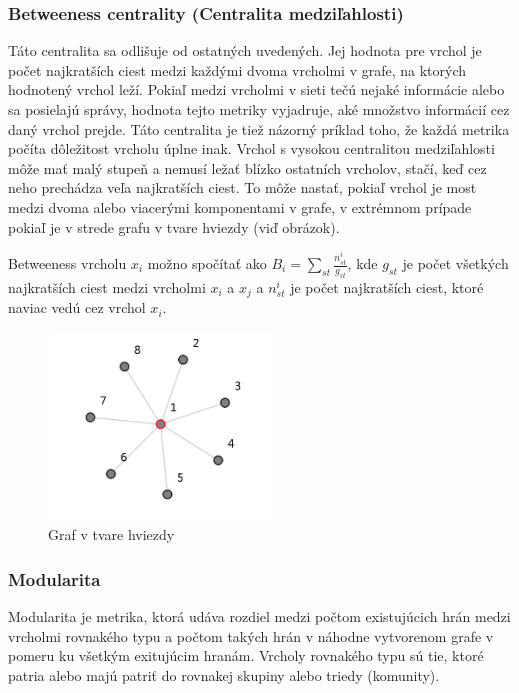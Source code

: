 \documentclass[slovak,master,public,dept460,male,cpdeclaration,oneside]{diploma}
\begin{document}
\subsubsection{Betweeness centrality (Centralita medziľahlosti)}
Táto centralita sa odlišuje od ostatných uvedených. Jej hodnota pre vrchol je počet najkratších ciest medzi každými dvoma vrcholmi v grafe, na ktorých hodnotený vrchol leží. Pokiaľ medzi vrcholmi v sieti tečú nejaké informácie alebo sa posielajú správy, hodnota tejto metriky vyjadruje, aké množstvo informácií cez daný vrchol prejde. Táto centralita je tiež názorný príklad toho, že každá metrika počíta dôležitost vrcholu úplne inak. Vrchol s vysokou centralitou medziľahlosti môže mať malý stupeň a nemusí ležať blízko ostatních vrcholov, stačí, keď cez neho  prechádza veľa najkratších ciest. To môže nastať, pokiaľ vrchol je most medzi dvoma alebo viacerými komponentami v grafe, v extrémnom prípade pokiaľ je v strede grafu v tvare hviezdy (viď obrázok).

Betweeness vrcholu ${x_{i}}$ možno spočítať ako ${B_{i} = \sum_{st}^{}\frac{n^{i}_{st}}{g_{st}}}$, kde ${g_{st}}$ je počet všetkých najkratších ciest medzi vrcholmi ${x_{i}}$ a ${x_{j}}$ a ${n^{i}_{st}}$ je počet najkratších ciest, ktoré naviac vedú cez vrchol ${x_{i}}$. 

\begin{figure}[H]
\centering
\includegraphics[width=6cm, height=5cm]{figures/graph_star}
\caption{Graf v tvare hviezdy}
\end{figure}

\subsubsection{Modularita}
Modularita je metrika, ktorá udáva rozdiel medzi počtom existujúcich hrán medzi vrcholmi rovnakého typu a počtom takých hrán v náhodne vytvorenom grafe v pomeru ku všetkým exitujúcim hranám. Vrcholy rovnakého typu sú tie, ktoré patria alebo majú patriť do rovnakej skupiny alebo triedy (komunity).
\end{document}
